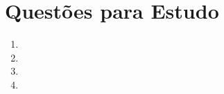\section{Questões para Estudo}
	\begin{enumerate}
		\item{}
		\item{}
		\item{}
		\item{}
	\end{enumerate}
